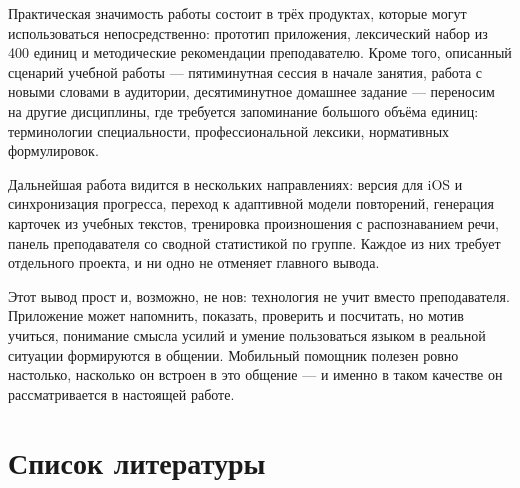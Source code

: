 \documentclass[11pt,a4paper,openany]{report}
\begin{document}
Практическая значимость работы состоит в трёх продуктах, которые могут использоваться непосредственно: прототип приложения, лексический набор из 400 единиц и методические рекомендации преподавателю. Кроме того, описанный сценарий учебной работы — пятиминутная сессия в начале занятия, работа с новыми словами в аудитории, десятиминутное домашнее задание — переносим на другие дисциплины, где требуется запоминание большого объёма единиц: терминологии специальности, профессиональной лексики, нормативных формулировок.

Дальнейшая работа видится в нескольких направлениях: версия для iOS и синхронизация прогресса, переход к адаптивной модели повторений, генерация карточек из учебных текстов, тренировка произношения с распознаванием речи, панель преподавателя со сводной статистикой по группе. Каждое из них требует отдельного проекта, и ни одно не отменяет главного вывода.

Этот вывод прост и, возможно, не нов: технология не учит вместо преподавателя. Приложение может напомнить, показать, проверить и посчитать, но мотив учиться, понимание смысла усилий и умение пользоваться языком в реальной ситуации формируются в общении. Мобильный помощник полезен ровно настолько, насколько он встроен в это общение — и именно в таком качестве он рассматривается в настоящей работе.

\chapter*{Список литературы}
\end{document}
